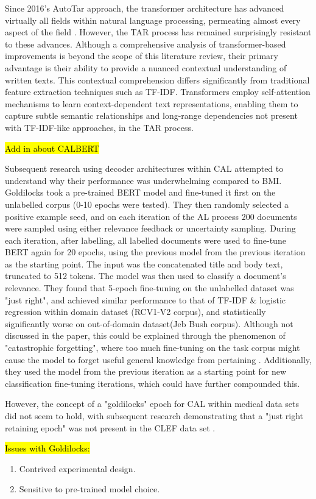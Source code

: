\documentclass[../main.tex]{subfiles}
\begin{document}
Since 2016's AutoTar approach, the transformer architecture has advanced virtually all fields within natural language processing, permeating almost every aspect of the field \cite{vaswani_attention_2023}. However, the TAR process has remained surprisingly resistant to these advances. Although a comprehensive analysis of transformer-based improvements is beyond the scope of this literature review, their primary advantage is their ability to provide a nuanced contextual understanding of written texts.
This contextual comprehension differs significantly from traditional feature extraction techniques such as TF-IDF. Transformers employ self-attention mechanisms to learn context-dependent text representations, enabling them to capture subtle semantic relationships and long-range dependencies not present with TF-IDF-like approaches, in the TAR process.

\hl{Add in about CALBERT}


Subsequent research using decoder architectures within CAL attempted to understand why their performance was underwhelming compared to BMI. 
Goldilocks \cite{yang_goldilocks_2022} took a pre-trained BERT model and fine-tuned it first on the unlabelled corpus (0-10 epochs were tested). They then randomly selected a positive example seed, and on each iteration of the AL process 200 documents were sampled using either relevance feedback or uncertainty sampling. During each iteration, after labelling, all labelled documents were used to fine-tune BERT again for 20 epochs, using the previous model from the previous iteration as the starting point. The input was the concatenated title and body text, truncated to 512 tokens. The model was then used to classify a document's relevance. They found that 5-epoch fine-tuning on the unlabelled dataset was "just right", and achieved similar performance to that of TF-IDF \& logistic regression within domain dataset (RCV1-V2 corpus), and statistically significantly worse on out-of-domain dataset(Jeb Bush corpus). Although not discussed in the paper, this could be explained through the phenomenon of "catastrophic forgetting", where too much fine-tuning on the task corpus might cause the model to forget useful general knowledge from pertaining \cite{xu_forget_2020}. Additionally, they used the model from the previous iteration as a starting point for new classification fine-tuning iterations, which could have further compounded this. 

However, the concept of a "goldilocks" epoch for CAL within medical data sets did not seem to hold, with subsequent research demonstrating that a "just right retaining epoch" was not present in the CLEF data set \cite{noauthor_ielabgoldilocks-reproduce_2024}. 

\hl{Issues with Goldilocks:}
\begin{enumerate}
    \item Contrived experimental design.
    \item Sensitive to pre-trained model choice.
\end{enumerate}
\end{document}
